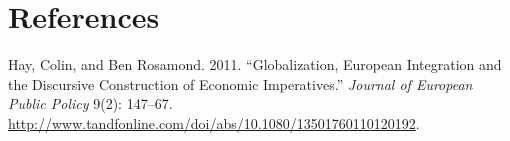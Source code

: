 \documentclass[11pt,article,oneside]{memoir}
\begin{document}
\pagebreak

\section{References}\label{references}

\setlength{\parindent}{-0.2in} \setlength{\leftskip}{0.2in}
\setlength{\parskip}{8pt} \vspace*{-0.2in} \noindent

Hay, Colin, and Ben Rosamond. 2011. ``Globalization, European
Integration and the Discursive Construction of Economic Imperatives.''
\emph{Journal of European Public Policy} 9(2): 147--67.
\url{http://www.tandfonline.com/doi/abs/10.1080/13501760110120192}.
\end{document}
